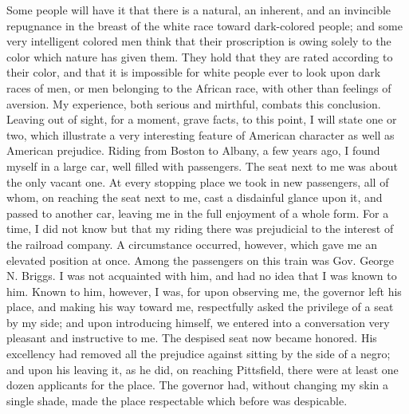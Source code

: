 Some people will have it that there is a natural, an inherent, and an
invincible repugnance in the breast of the white race toward
dark-colored people; and some very intelligent colored men think that
their proscription is owing solely to the color which nature has given
them. They hold that they are rated according to their color, and that
it is impossible for white people ever to look upon dark races of men,
or men belonging to the African race, with other than feelings of
aversion. My experience, both serious and mirthful, combats this
conclusion. Leaving out of sight, for a moment, grave facts, to this
point, I will state one or two, which illustrate a very interesting
feature of American character as well as American prejudice. Riding from
Boston to Albany, a few years ago, I found myself in a large car, well
filled with passengers. The seat next to me was about the only vacant
one. At every stopping place we took in new passengers, all of whom, on
reaching {\protect\hypertarget{403}{}{}}the seat next to me, cast a
disdainful glance upon it, and passed to another car, leaving me in the
full enjoyment of a whole form. For a time, I did not know but that my
riding there was prejudicial to the interest of the railroad company. A
circumstance occurred, however, which gave me an elevated position at
once. Among the passengers on this train was Gov. George N. Briggs. I
was not acquainted with him, and had no idea that I was known to him.
Known to him, however, I was, for upon observing me, the governor left
his place, and making his way toward me, respectfully asked the
privilege of a seat by my side; and upon introducing himself, we entered
into a conversation very pleasant and instructive to me. The despised
seat now became honored. His excellency had removed all the prejudice
against sitting by the side of a negro; and upon his leaving it, as he
did, on reaching Pittsfield, there were at least one dozen applicants
for the place. The governor had, without changing my skin a single
shade, made the place respectable which before was despicable.

